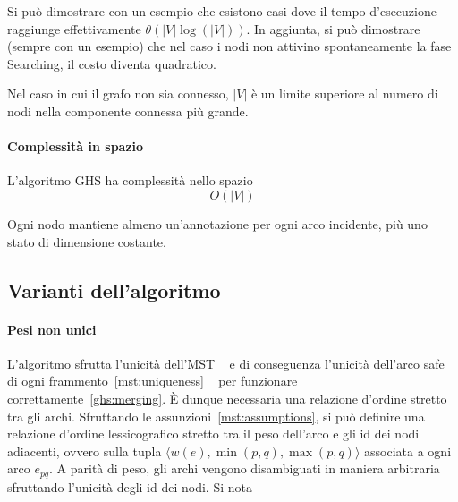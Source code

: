 \documentclass[target=bach,aauheader=,style=]{thud}
\newcommand{\eng}[1]{\foreignlanguage{english}{#1}}
\begin{document}
Si può dimostrare con un esempio che esistono casi dove il tempo d'esecuzione raggiunge effettivamente $\theta(|V|\log(|V|))$. In aggiunta, si può dimostrare (sempre con un esempio) che nel caso i nodi non attivino spontaneamente la fase \eng{Searching}, il costo diventa quadratico.

Nel caso in cui il grafo non sia connesso, $|V|$ è un limite superiore al numero di nodi nella componente connessa più grande.

\paragraph{Complessità in spazio}
L'algoritmo GHS ha complessità nello spazio
$$
O(|V|)
$$

Ogni nodo mantiene almeno un'annotazione per ogni arco incidente, più uno stato di dimensione costante.

\subsection{Varianti dell'algoritmo}

\paragraph{Pesi non unici}\label{ghs:weights}
L'algoritmo sfrutta l'unicità dell'MST \,\textendash\,~e di conseguenza l'unicità dell'arco \eng{safe} di ogni frammento~\ref{mst:uniqueness}~\,\textendash\, per funzionare correttamente~\ref{ghs:merging}. È dunque necessaria una relazione d'ordine stretto tra gli archi. Sfruttando le assunzioni~\ref{mst:assumptions}, si può definire una relazione d'ordine lessicografico stretto tra il peso dell'arco e gli id dei nodi adiacenti, ovvero sulla tupla $\langle w(e),\min(p,q),\max(p,q)\rangle$ associata a ogni arco $e_{pq}$. A parità di peso, gli archi vengono disambiguati in maniera arbitraria sfruttando l'unicità degli id dei nodi. Si nota 
\end{document}
